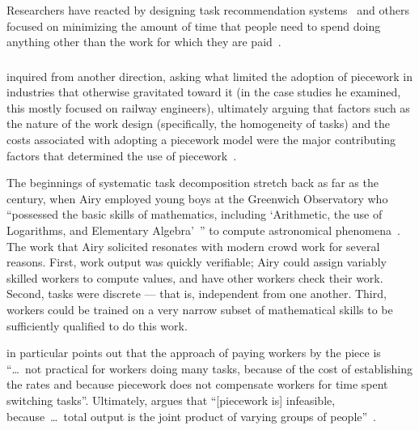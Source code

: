\documentclass[trackingWork]{subfiles}
\begin{document}
Researchers have reacted by designing task recommendation systems~\cite[e.g.][]{Cosley:2007:SUI:1216295.1216309}
and others focused on
minimizing the amount of time that people need to spend doing anything other than
the work for which they are paid~\cite{callison2014crowd}.



\onlyinsubfile{\clearpage}
\subsubsection{\pieceworkpers}

\begin{comment}
notes: what info do i assume the reader has seen already?
- Brown: Task variability matters
- Airy and his human computers were great:
  - quickly verifiable
  - independent tasks (could be checked without the whole product)
  - narrowly trainable
\end{comment}

\citeauthor{Brown01041990} inquired from another direction,
asking
what limited the adoption of piecework in industries that otherwise gravitated toward it
(in the case studies he examined,
this mostly focused on railway engineers),
ultimately arguing that factors such as the nature of the work design
(specifically,
the homogeneity of tasks) and the costs associated with adopting a piecework model
were the major contributing factors that determined the use of piecework~\cite{Brown01041990}.



The beginnings of
systematic task decomposition 
stretch back as far as the  century,
when Airy employed young boys at the Greenwich Observatory who
``possessed the basic skills of mathematics,
including
`Arithmetic,
the use of Logarithms,
and Elementary Algebra'~''
to compute astronomical phenomena~\cite{grier2013computers}.
The work that Airy solicited resonates with modern crowd work for several reasons.
First, work output was quickly verifiable;
Airy could assign variably skilled workers to compute values,
and have other workers check their work.
Second, tasks were discrete
--- that is,
independent from one another.
Third, workers could be trained on a very narrow subset of mathematical skills to be
sufficiently qualified to do this work.


\citeauthor{bewley1999wages} in particular points out that
the approach of paying workers by the piece is
``\dots~not practical for workers doing many tasks,
because of
the cost of establishing the rates and because
piecework does not compensate workers for time spent switching tasks''.
Ultimately, \citeauthor{bewley1999wages} argues that
``[piecework is] infeasible,
because~\dots~total output is the joint product of varying groups of people''~\cite{bewley1999wages}.
\end{document}
